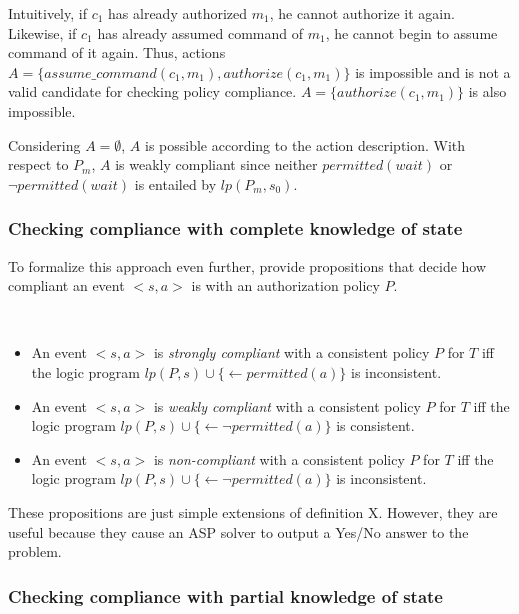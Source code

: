Intuitively, if $c_1$ has already authorized $m_1$, he cannot authorize it again.
Likewise, if $c_1$ has already assumed command of $m_1$, he cannot begin to assume command of it again.
Thus, actions $A = \{assume\_command(c_1, m_1), authorize(c_1, m_1)\}$ is impossible and is not a valid candidate for checking policy compliance.
$A = \{authorize(c_1, m_1)\}$ is also impossible.

Considering $A=\emptyset$, $A$ is possible according to the action description.
With respect to $P_m$, $A$ is weakly compliant since neither $permitted(wait)$ or $\neg permitted(wait)$ is entailed by $lp(P_m, s_0)$.

\subsubsection{Checking compliance with complete knowledge of state}

To formalize this approach even further, \citet{gelfond_authorization_2008} provide propositions that decide how compliant an event $<s,a>$ is with an authorization policy $P$.

\begin{definition}
    ~

    \begin{itemize}
        \item An event $<s, a>$ is \textit{strongly compliant} with a consistent policy $P$ for $T$ iff the logic program $lp(P, s) \cup \{ \leftarrow permitted(a) \}$ is inconsistent.
        \item An event $<s, a>$ is \textit{weakly compliant} with a consistent policy $P$ for $T$ iff the logic program $lp(P, s) \cup \{ \leftarrow \neg permitted(a) \}$ is consistent.
        \item An event $<s, a>$ is \textit{non-compliant} with a consistent policy $P$ for $T$ iff the logic program $lp(P, s) \cup \{ \leftarrow \neg permitted(a) \}$ is inconsistent.
    \end{itemize}
\end{definition}

These propositions are just simple extensions of definition X.
However, they are useful because they cause an ASP solver to output a Yes/No answer to the problem.

\subsubsection{Checking compliance with partial knowledge of state}

